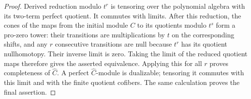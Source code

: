 \begin{proof}
Derived reduction modulo $t^r$ is tensoring over the polynomial
algebra with its two-term perfect quotient. It commutes with
limits. After this reduction, the cones of the maps from the
initial module $C$ to its quotients modulo $t^s$ form a pro-zero
tower: their transitions are multiplications by $t$ on the
corresponding shifts, and any $r$ consecutive transitions are
null because $t^r$ has its quotient nullhomotopy. Their inverse
limit is zero. Taking the limit of the reduced quotient maps
therefore gives the asserted equivalence. Applying this for all
$r$ proves completeness of $\widehat C$. A perfect
$\widehat C$-module is dualizable; tensoring it commutes with
this limit and with the finite quotient cofibers. The same
calculation proves the final assertion.
\end{proof}
